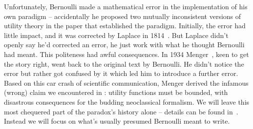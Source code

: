 Unfortunately, Bernoulli made a mathematical error in the implementation 
of his own paradigm -- accidentally he proposed two mutually inconsistent versions of utility theory in the paper that established the paradigm. Initially, the error had little impact, and it was corrected by Laplace in 
1814~\cite{Laplace1814}. But Laplace didn't openly say he'd corrected an error, he just work with what he thought Bernoulli had meant. This politeness had awful consequences. In
1934 Menger~\cite{Menger1934}, keen to get the story right, went back to the original text by Bernoulli. He didn't notice the error but rather got confused by it which led him to introduce a further error. Based on this car crash of scientific communication, Menger derived the infamous (wrong) claim we encountered in : utility functions must be bounded, with disastrous consequences for the budding neoclassical formalism. We 
will leave this most chequered part of the paradox's history alone -- details can be found 
in~\cite{PetersGell-Mann2016}. Instead we will focus on what's usually 
presumed Bernoulli meant to write.

